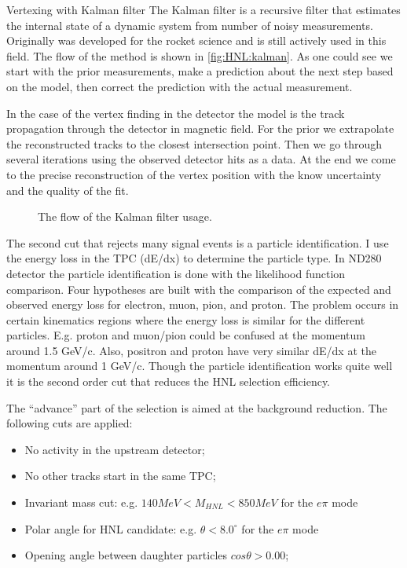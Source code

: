 \documentclass[../main.tex]{subfiles}
\begin{document}
\begin{bclogo}[couleur=blue!2, arrondi=0.1, logo=\bcinfo, nobreak=true]{Vertexing with Kalman filter}
    The Kalman filter is a recursive filter that estimates the internal state of a dynamic system from number of noisy measurements. Originally was developed for the rocket science and is still actively used in this field. The flow of the method is shown in \autoref{fig:HNL:kalman}. As one could see we start with the prior measurements, make a prediction about the next step based on the model, then correct the prediction with the actual measurement.

    In the case of the vertex finding in the detector the model is the track propagation through the detector in magnetic field. For the prior we extrapolate the reconstructed tracks to the closest intersection point. Then we go through several iterations using the observed detector hits as a data. At the end we come to the precise reconstruction of the vertex position with the know uncertainty and the quality of the fit.
\end{bclogo}

\begin{figure}[!ht]
  \caption{The flow of the Kalman filter usage.}
  \label{fig:HNL:kalman}
\end{figure}

The second cut that rejects many signal events is a particle identification. I use the energy loss in the TPC (dE/dx) to determine the particle type. In ND280 detector the particle identification is done with the likelihood function comparison. Four hypotheses are built with the comparison of the expected and observed energy loss for electron, muon, pion, and proton. The problem occurs in certain kinematics regions where the energy loss is similar for the different particles. E.g. proton and muon/pion could be confused at the momentum around 1.5 GeV/c. Also, positron and proton have very similar dE/dx at the momentum around 1 GeV/c. Though the particle identification works quite well it is the second order cut that reduces the HNL selection efficiency.

The ``advance'' part of the selection is aimed at the background reduction. The following cuts are applied:

\begin{itemize}
  \item No activity in the upstream detector;
  \item No other tracks start in the same TPC;
  \item Invariant mass cut: e.g. $140MeV<M_{HNL}<850MeV$ for the $e\pi$ mode
  \item Polar angle for HNL candidate: e.g. $\theta < 8.0^\circ$ for the $e\pi$ mode
  \item Opening angle between daughter particles $cos\theta >0.00$;
\end{itemize}
\end{document}
